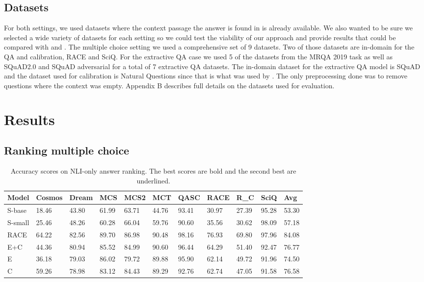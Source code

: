 \documentclass[11pt]{article}
\begin{document}
\subsection{Datasets}
For both settings, we used datasets where the context passage the answer is found in is already available. We also wanted to be sure we selected a wide variety of datasets for each setting so we could test the viability of our approach and provide results that could be compared with \citet{chen_can_2021} and \citet{mishra_looking_2021}. The multiple choice setting we used a comprehensive set of 9 datasets. Two of those datasets are in-domain for the QA and calibration, RACE and SciQ. For the extractive QA case we used 5 of the datasets from the MRQA 2019 task \citep{fisch_mrqa_2019} as well as SQuAD2.0 \citep{rajpurkar_know_2018} and SQuAD adversarial \citep{jia_adversarial_2017} for a total of 7 extractive QA datasets. The in-domain dataset for the extractive QA model is SQuAD and the dataset used for calibration is Natural Questions since that is what was used by \citet{chen_can_2021}. The only preprocessing done was to remove questions where the context was empty. Appendix B describes full details on the datasets used for evaluation.
\section{Results}
\subsection{Ranking multiple choice}
\begin{table*}[]
\centering
\begin{tabular}{lllllllllll}
\hline
Model & Cosmos & Dream & MCS & MCS2 & MCT & QASC & RACE & R_C & SciQ & Avg \\ \hline
S-base & 18.46 & 43.80 & 61.99 & 63.71 & 44.76 & 93.41 & 30.97 & 27.39 & 95.28 & 53.30 \\
S-small & 25.46 & 48.26 & 60.28 & 66.04 & 59.76 & 90.60 & 35.56 & 30.62 & 98.09 & 57.18 \\
RACE & 64.22 & 82.56 & 89.70 & 86.98 & 90.48 & 98.16 & 76.93 & 69.80 & 97.96 & 84.08 \\
E+C & 44.36 & 80.94 & 85.52 & 84.99 & 90.60 & 96.44 & 64.29 & 51.40 & 92.47 & 76.77 \\
E & 36.18 & 79.03 & 86.02 & 79.72 & 89.88 & 95.90 & 62.14 & 49.72 & 91.96 & 74.50 \\
C & 59.26 & 78.98 & 83.12 & 84.43 & 89.29 & 92.76 & 62.74 & 47.05 & 91.58 & 76.58 \\ \hline
\end{tabular}
\caption{Accuracy scores on NLI-only answer ranking. The best scores are bold and the second best are underlined.}
\label{tab:nli_only_performance}
\end{table*}
\end{document}
